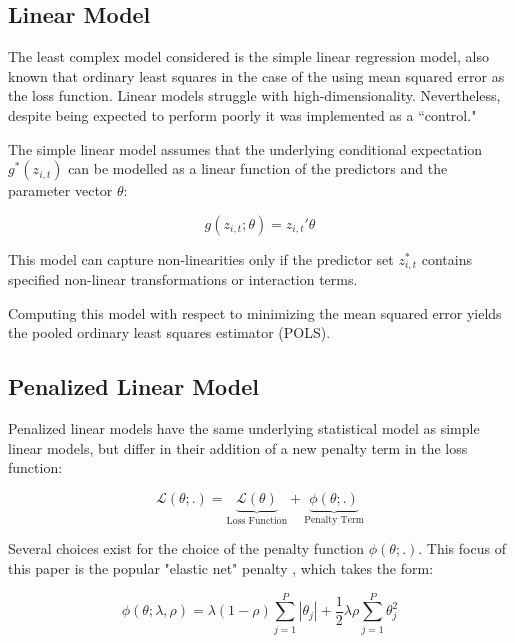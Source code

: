 \documentclass[a4paper]{article}
\begin{document}
	\subsection{Linear Model}
	
	The least complex model considered is the simple linear regression model, also known that ordinary least squares in the case of the using mean squared error as the loss function. Linear models struggle with high-dimensionality. Nevertheless, despite being expected to perform poorly it was implemented as a ``control."
	
	The simple linear model assumes that the underlying conditional expectation \( g^*(z_{i, t}) \) can be modelled as a linear function of the predictors and the parameter vector \( \theta \):
	
	\begin{equation}
	g(z_{i, t};\theta) = z_{i, t}' \theta
	\end{equation}
	
	This model can capture non-linearities only if the predictor set \(z^*_{i, t}\) contains specified non-linear transformations or interaction terms. 
	
	Computing this model with respect to minimizing the mean squared error yields the pooled ordinary least squares estimator (POLS).
	
	\subsection{Penalized Linear Model}
	
	Penalized linear models have the same underlying statistical model as simple linear models, but differ in their addition of a new penalty term in the loss function:
	
	\begin{equation}
	\mathcal{L(\theta;.)} = 
	\underset{\text{Loss Function}}{\underbrace{\mathcal{L(\theta)}}} + 
	\underset{\text{Penalty Term}}{\underbrace{\phi(\theta;.)}}
	\end{equation}
	
	Several choices exist for the choice of the penalty function \( \phi(\theta;.) \). This focus of this paper is the popular "elastic net" penalty  \citep{zou_regularization_2005}, which takes the form:
	
	\begin{equation}
	\phi(\theta;\lambda,\rho) = 
	\lambda(1-\rho) \sum_{j = 1}^{P}|\theta_j| +
	\frac{1}{2} \lambda \rho \sum_{j = 1}^{P}\theta_j^2
	\end{equation}
	
\end{document}
